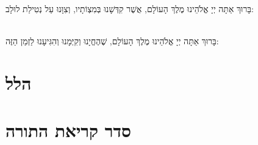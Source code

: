 \documentclass[twoside, openany, parskip=half, 11pt]{book}
\begin{document}
\\
בָּרוּךְ אַתָּה יְיָ אֱלֹהֵינוּ מֶלֶךְ הָעוֹלָם, אֲשֶׁר קִדְּשָׁנוּ בְּמִצְוֹתָיו, וְצִוָּנוּ עַל נְטִילַת לוּלָב:

\vspace{.5\baselineskip}

\\
בָּרוּךְ אַתָּה יְיָ אֱלֹהֵינוּ מֶלֶךְ הָעוֹלָם, שֶׁהֶחֱיָנוּ וְקִיְּמָנוּ וְהִגִּיעָנוּ לַזְמַן הַזֶּה:

\section[הלל‎]{ הלל‎ }
\label{sometimes hallel}

\hallel



\fullkaddish

 \pageref{shir_shel_shabbos}

\clearpage

\section[סדר קריאת התורה]{ סדר קריאת התורה }





\end{document}

